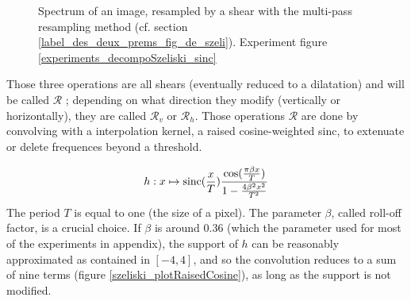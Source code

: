\begin{figure}
		\caption{Spectrum of an image, resampled by a shear with the multi-pass resampling method (cf. section \ref{label_des_deux_prems_fig_de_szeli}). Experiment figure \ref{experiments_decompoSzeliski_sinc} }
		\label{szeliski_decompoSzeliski}
	\end{figure}
	
	
	Those three operations are all shears (eventually reduced to a dilatation) and will be called $\mathcal R$ ; depending on what direction they modify (vertically or horizontally), 	they are called $\mathcal R_v$ or $\mathcal R_h$. Those operations $\mathcal R$ are done by convolving with a interpolation kernel, a raised cosine-weighted sinc, to extenuate or delete frequences beyond a threshold.
	
	\begin{equation}
	h : x \mapsto \operatorname{sinc}(\frac{x}{T})\frac{\cos(\frac{\pi\beta x}{T})}{1-\frac{4\beta^2x^2}{T^2}}
	\label{szeliski_definition_raisedCosineWeightedSinc}
	\end{equation}
	The period $T$ is equal to one (the size of a pixel).
	The parameter $\beta$, called roll-off factor, is a crucial choice. If $\beta$ is around $0.36$ (which the parameter used for most of the experiments in appendix), the support of $h$ can be reasonably approximated as contained in $[-4,4]$, and so the convolution reduces to a sum of nine terms (figure \ref{szeliski_plotRaisedCosine}), as long as the support is not modified.
	
